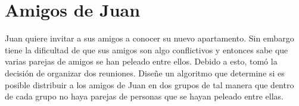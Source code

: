 \section{Amigos de Juan}
Juan quiere invitar a sus amigos a conocer su nuevo apartamento. Sin embargo tiene la dificultad de que sus amigos son algo conflictivos y entonces sabe que varias parejas de amigos se han peleado entre ellos. Debido a esto, tomó la decisión de organizar dos reuniones. Diseñe un algoritmo que determine si es posible distribuir a los amigos de Juan en dos grupos de tal manera que dentro de cada grupo no haya parejas de personas que se hayan peleado entre ellas.
